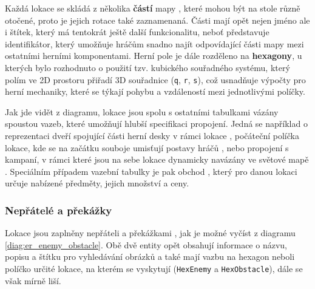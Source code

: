 Každá lokace se skládá z několika \textbf{částí} mapy , které mohou být na stole různě otočené, proto je jejich rotace  také zaznamenaná. Části mají opět nejen jméno ale i štítek, který má tentokrát ještě další funkcionalitu, neboť představuje identifikátor, který umožňuje hráčům snadno najít odpovídající části mapy mezi ostatními herními komponentami. Herní pole je dále rozděleno na \textbf{hexagony}, u kterých bylo rozhodnuto o použití tzv. kubického souřadného systému, který polím ve 2D prostoru přiřadí 3D souřadnice (\texttt{q}, \texttt{r}, \texttt{s}), což usnadňuje výpočty pro herní mechaniky, které se týkají pohybu a vzdáleností mezi jednotlivými políčky.

Jak jde vidět z diagramu, lokace jsou spolu s ostatními tabulkami vázány spoustou vazeb, které umožňují hlubší specifikaci propojení. Jedná se například o reprezentaci dveří spojující části herní desky v rámci lokace , počáteční políčka lokace, kde se na začátku souboje umisťují postavy hráčů , nebo propojení s kampaní, v rámci které jsou na sebe lokace dynamicky navázány ve světové mapě . Speciálním případem vazební tabulky je pak obchod , který pro danou lokaci určuje nabízené předměty, jejich množství a ceny.

\subsubsection*{Nepřátelé a překážky}
\label{subsubsec:schema_enemy_obstacle}

Lokace jsou zaplněny nepřáteli  a překážkami , jak je možné vyčíst z diagramu \ref{diag:er_enemy_obstacle}. Obě dvě entity opět obsahují informace o názvu, popisu a štítku pro vyhledávání obrázků a také mají vazbu na hexagon neboli políčko určité lokace, na kterém se vyskytují (\texttt{HexEnemy} a \texttt{HexObstacle}), dále se však mírně liší.

